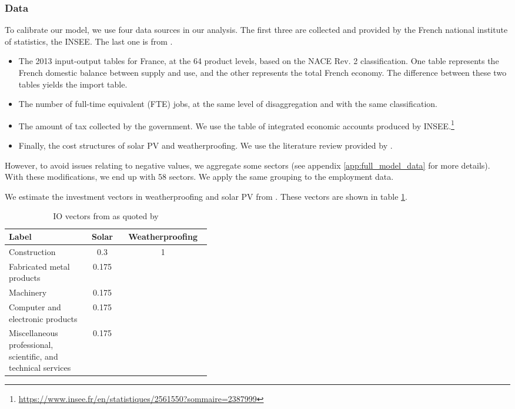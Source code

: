 \subsubsection{Data}
To calibrate our model, we use four data sources in our analysis. The first three are collected and provided by the French national institute of statistics, the INSEE. The last one is from \citet{Garrett2017}.
\begin{itemize}
	\item The 2013 input-output tables for France, at the 64 product levels, based on the NACE Rev. 2 classification. One table represents the French domestic balance between supply and use, and the other represents the total French economy. The difference between these two tables yields the import table.
	\item The number of full-time equivalent (FTE) jobs, at the same level of disaggregation and with the same classification.
	\item The amount of tax collected by the government. We use the table of integrated economic accounts produced by INSEE.\footnote{\url{https://www.insee.fr/en/statistiques/2561550?sommaire=2387999}}
	\item Finally, the cost structures of solar PV and weatherproofing. We use the literature review provided by \citet{Garrett2017}.
\end{itemize}

However, to avoid issues relating to negative values, we aggregate some sectors (see appendix \ref{app:full_model_data} for more details). With these modifications, we end up with 58 sectors. We apply the same grouping to the employment data.

We estimate the investment vectors in weatherproofing and solar PV from \citet{Pollin2015}. These vectors are shown in table \ref{tab:IO_vectors}.

\begin{table}[!h]
	\centering
	\caption{IO vectors from \citet{Pollin2015} as quoted by \citet{Garrett2017}}
	\label{tab:IO_vectors}
	\begin{tabular}{p{0.4\linewidth}cc}
		\toprule
		Label  & Solar & Weatherproofing \\
		\midrule
		Construction& 0.3 & 1 \\
		Fabricated metal products& 0.175 &  \\
		Machinery& 0.175 &  \\
		Computer and electronic products& 0.175 &   \\
		Miscellaneous professional, scientific, and technical services& 0.175 &   \\
		\bottomrule
	\end{tabular}
\end{table}


